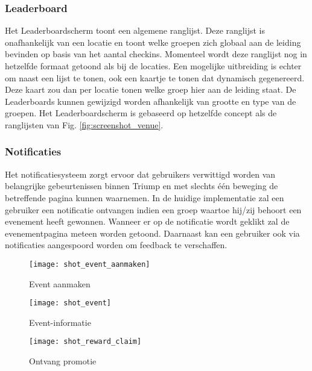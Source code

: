 \subsubsection{Leaderboard}%
Het Leaderboardscherm toont een algemene ranglijst. Deze ranglijst is onafhankelijk van een locatie en toont welke groepen zich globaal aan de leiding bevinden op basis van het aantal checkins. Momenteel wordt deze ranglijst nog in hetzelfde formaat getoond als bij de locaties. Een mogelijke uitbreiding is echter om naast een lijst te tonen, ook een kaartje te tonen dat dynamisch gegenereerd. Deze kaart zou dan per locatie tonen welke groep hier aan de leiding staat. De Leaderboards kunnen gewijzigd worden afhankelijk van grootte en type van de groepen. Het Leaderboardscherm is gebaseerd op hetzelfde concept als de ranglijsten van Fig. \ref{fig:screenshot_venue}.
\subsubsection{Notificaties} %
Het notificatiesysteem zorgt ervoor dat gebruikers verwittigd worden van belangrijke gebeurtenissen binnen Triump en met slechts één beweging de betreffende pagina kunnen waarnemen. In de huidige implementatie zal een gebruiker een notificatie ontvangen indien een groep waartoe hij/zij behoort een evenement heeft gewonnen. Wanneer er op de notificatie wordt geklikt zal de evenementpagina meteen worden getoond. Daarnaast kan een gebruiker ook via notificaties aangespoord worden om feedback te verschaffen.   

\begin{figure}[ht]

\begin{minipage}[b]{0.25\linewidth}
\centering
\texttt{[image: shot\_event\_aanmaken]}
\caption{Event aanmaken}
\label{fig:shot_event_aanmaken}
\end{minipage}
\hspace{1.8cm}
\begin{minipage}[b]{0.25\linewidth}
\centering
\texttt{[image: shot\_event]}
\caption{Event-informatie}
\label{fig:shot_event}
\end{minipage}
\hspace{1.8cm}
\begin{minipage}[b]{0.25\linewidth}
\centering
\texttt{[image: shot\_reward\_claim]}
\caption{Ontvang promotie}
\label{fig:shot_reward_claim}
\end{minipage}
\end{figure}
\clearpage

